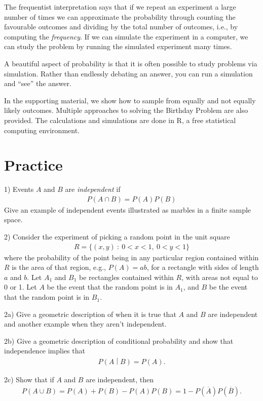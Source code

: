 The frequentist interpretation says that if we repeat an experiment a large number of times we can
approximate the probability through counting the favourable outcomes and dividing by the total number of outcomes, i.e.,
by computing the \emph{frequency}.
If we can simulate the experiment in a computer, 
we can study the problem by running the simulated experiment many times.

A beautiful aspect of probability is that it is often possible to study problems via simulation. 
Rather than endlessly debating an answer, 
you can run a simulation and ``see'' the answer. 

In the supporting material, 
we show how to sample from equally and not equally likely outcomes. 
Multiple approaches to solving the Birthday Problem are also provided. 
The calculations and simulations are done in R, 
a free statistical computing environment.

\section{Practice}\label{practice}

1) Events \(A\) and \(B\) are \emph{independent} if
\begin{align}
P(A \cap B) = P(A)P(B)
\end{align}
Give an example of independent events illustrated as marbles in a finite
sample space.

2) Consider the experiment of picking a random point in the unit square
\begin{align}
R = \{(x,y)\ :\ 0 < x < 1,\ 0 < y < 1\}
\end{align}
where the probability of the point being in any particular region
contained within \(R\) is the area of that region, e.g., \(P(A) = ab\),
for a rectangle with sides of length \(a\) and \(b\). Let \(A_{1}\) and
\(B_{1}\) be rectangles contained within \(R\), with areas not equal to
0 or 1. Let \(A\) be the event that the random point is in \(A_{1}\),
and \(B\) be the event that the random point is in \(B_{1}\).

2a) Give a geometric description of when it is true that \(A\) and \(B\)
are independent and another example when they aren't independent.

2b) Give a geometric description of conditional probability and show that
independence implies that
\begin{align}
P\left( A \middle| B \right) = P(A).
\end{align}

2c) Show that if \(A\) and \(B\) are independent, then
\begin{align}
P(A \cup B) = P(A) + P(B) - P(A)P(B) = 1 - P\left( \overline{A} \right)P(\overline{B}).
\end{align}






